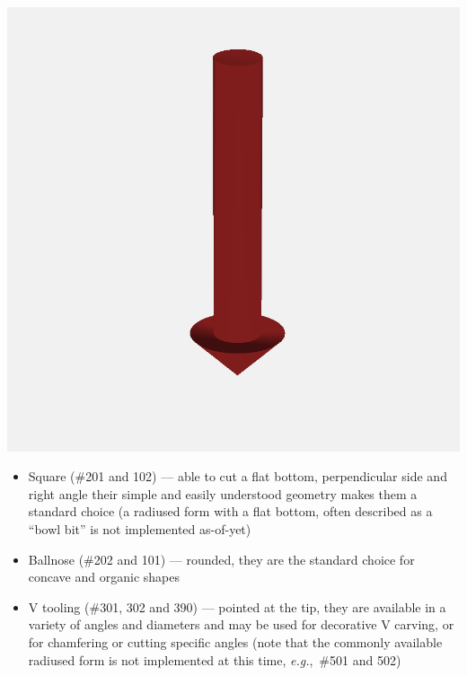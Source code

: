\documentclass{ltxdoc}
\begin{document}
\begin{samepage}
           \includegraphics[width=\linewidth/3]{images/tool_V_301.png}%

\begin{itemize}
\item Square (\#201 and 102) --- able to cut a flat bottom, perpendicular side and right angle
                                 their simple and easily understood geometry makes them a 
                                 standard choice (a radiused form with a flat bottom, often
                                 described as a ``bowl bit'' is not implemented as-of-yet)
\item Ballnose (\#202 and 101) --- rounded, they are the standard choice for concave and 
                                   organic shapes
\item V tooling (\#301, 302 and 390) --- pointed at the tip, they are available in a variety of
                                         angles and diameters and may be used for decorative
                                         V carving, or for chamfering or cutting specific angles
                                         (note that the commonly available radiused form is not
                                         implemented at this time, \emph{e.g.},~\#501 and 502)
\end{itemize}
\end{samepage}
\end{document}
